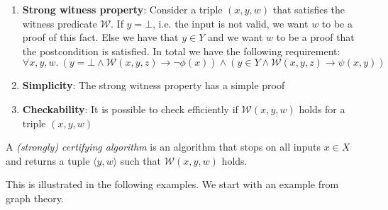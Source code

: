 \begin{enumerate}
    \item \textbf{Strong witness property}: Consider a triple $(x,y,w)$ that satisfies the witness predicate $\mathcal{W}$. If $y=\bot$, i.e. the input is not valid, we want $w$ to be a proof of this fact. Else we have that $y\in Y$ and we want $w$ to be a proof that the postcondition is satisfied. In total we have the following requirement:
    \[ \forall x,y,w.\ (y = \bot \land \mathcal{W}(x,y,z) \rightarrow \neg \phi(x)) \land (y \in Y \land \mathcal{W}(x,y,z) \rightarrow \psi(x,y)) \]
    \item \textbf{Simplicity}: The strong witness property has a simple proof
    \item \textbf{Checkability}: It is possible to check efficiently if $\mathcal{W}(x,y,w)$ holds for a triple $(x,y,w)$
\end{enumerate}

A \textit{(strongly) certifying algorithm} is an algorithm that stops on all inputs $x \in X$ and returns a tuple $\langle y, w\rangle$ such that $\mathcal{W}(x,y,w)$ holds.

This is illustrated in the following examples. We start with an example from graph theory.

